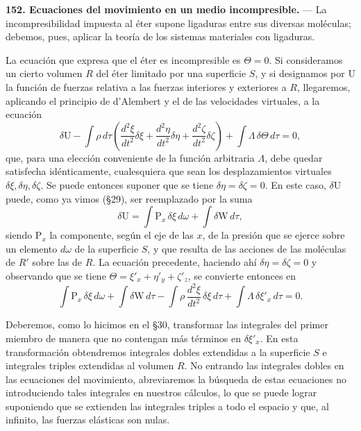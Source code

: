 \noindent\textbf{152. Ecuaciones del movimiento en un medio incompresible.}
— La incompresibilidad impuesta al éter supone ligaduras entre sus
diversas moléculas; debemos, pues, aplicar la teoría de los sistemas
materiales con ligaduras.

La ecuación que expresa que el éter es incompresible es $\Theta=0$. Si
consideramos un cierto volumen $R$ del éter limitado por una superficie
$S$, y si designamos por $\mathrm{U}$ la función de fuerzas relativa a las fuerzas
interiores y exteriores a $R$, llegaremos, aplicando el principio de
d'Alembert y el de las velocidades virtuales, a la ecuación
\[
\delta \mathrm{U}-\int\rho\,d\tau\left(\frac{d^2\xi}{dt^2}\delta\xi
+\frac{d^2\eta}{dt^2}\delta\eta+\frac{d^2\zeta}{dt^2}\delta\zeta\right)
+\int\Lambda\,\delta\Theta\,d\tau=0,
\]
que, para una elección conveniente de la función arbitraria $\Lambda$,
debe quedar satisfecha idénticamente, cualesquiera que sean los
desplazamientos virtuales $\delta\xi,\delta\eta,\delta\zeta$. Se puede
entonces suponer que se tiene $\delta\eta=\delta\zeta=0$. En este caso,
$\delta \mathrm{U}$ puede, como ya vimos (§29), ser reemplazado por la suma
\[
\delta \mathrm{U}=\int \mathrm{P}_x\,\delta\xi\,d\omega+\int\delta \mathrm{W}\,d\tau,
\]
siendo $\mathrm{P}_x$ la componente, según el eje de las $x$, de la presión que se
ejerce sobre un elemento $d\omega$ de la superficie $S$, y que resulta de
las acciones de las moléculas de $R'$ sobre las de $R$. La ecuación
precedente, haciendo ahí $\delta\eta=\delta\zeta=0$ y observando que se
tiene $\Theta=\xi'_x+\eta'_y+\zeta'_z$, se convierte entonces en
\begin{equation}
\int \mathrm{P}_x\,\delta\xi\,d\omega+\int\delta \mathrm{W}\,d\tau
-\int\rho\,\frac{d^2\xi}{dt^2}\,\delta\xi\,d\tau
+\int\Lambda\,\delta\xi'_x\,d\tau=0.
\tag{1}
\end{equation}

Deberemos, como lo hicimos en el §30, transformar las
integrales del primer miembro de manera que no contengan más términos en
$\delta\xi'_x$. En esta transformación obtendremos integrales dobles
extendidas a la superficie $S$ e integrales triples extendidas al volumen
$R$. No entrando las integrales dobles en las ecuaciones del movimiento,
abreviaremos la búsqueda de estas ecuaciones no introduciendo tales
integrales en nuestros cálculos, lo que se puede lograr suponiendo que se
extienden las integrales triples a todo el espacio y que, al infinito, las
fuerzas elásticas son nulas.

